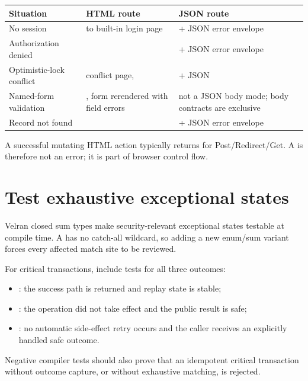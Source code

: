 \begin{longtable}{L{0.27\textwidth}L{0.31\textwidth}L{0.31\textwidth}}
\toprule
Situation & HTML route & JSON route \\
\midrule
\endhead
No session &  to built-in login page &  + JSON error envelope \\
\addlinespace
Authorization denied &  &  + JSON error envelope \\
\addlinespace
Optimistic-lock conflict &  conflict page,  &  + JSON  \\
\addlinespace
Named-form validation & , form rerendered with field errors & not a JSON body mode; body contracts are exclusive \\
\addlinespace
Record not found &  &  + JSON error envelope \\
\bottomrule
\end{longtable}

A successful mutating HTML action typically returns  for Post/Redirect/Get. A  is therefore not an error; it is part of browser control flow.

\section{Test exhaustive exceptional states}

Velran closed sum types make security-relevant exceptional states testable at compile time. A  has no catch-all wildcard, so adding a new enum/sum variant forces every affected match site to be reviewed.

For critical transactions, include tests for all three outcomes:

\begin{itemize}
  \item {}: the success path is returned and replay state is stable;
  \item {}: the operation did not take effect and the public result is safe;
  \item {}: no automatic side-effect retry occurs and the caller receives an explicitly handled safe outcome.
\end{itemize}

Negative compiler tests should also prove that an idempotent critical transaction without outcome capture, or without exhaustive matching, is rejected.


